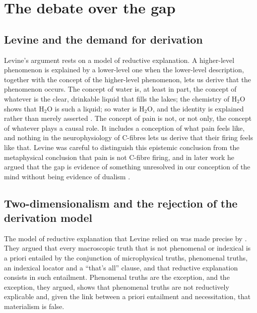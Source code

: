\documentclass{situationist-preprint}
\begin{document}
\section{The debate over the gap}\label{s:history}

\subsection{Levine and the demand for derivation}

Levine's argument rests on a model of reductive explanation. A higher-level phenomenon is explained by a lower-level one when the lower-level description, together with the concept of the higher-level phenomenon, lets us derive that the phenomenon occurs. The concept of water is, at least in part, the concept of whatever is the clear, drinkable liquid that fills the lakes; the chemistry of H$_2$O shows that H$_2$O is such a liquid; so water is H$_2$O, and the identity is explained rather than merely asserted \citep{Levine1993}. The concept of pain is not, or not only, the concept of whatever plays a causal role. It includes a conception of what pain feels like, and nothing in the neurophysiology of C-fibres lets us derive that their firing feels like that. Levine was careful to distinguish this epistemic conclusion from the metaphysical conclusion that pain is not C-fibre firing, and in later work he argued that the gap is evidence of something unresolved in our conception of the mind without being evidence of dualism \citep{Levine2001}.

\subsection{Two-dimensionalism and the rejection of the derivation model}

The model of reductive explanation that Levine relied on was made precise by \citet{ChalmersJackson2001}. They argued that every macroscopic truth that is not phenomenal or indexical is a priori entailed by the conjunction of microphysical truths, phenomenal truths, an indexical locator and a \enquote{that's all} clause, and that reductive explanation consists in such entailment. Phenomenal truths are the exception, and the exception, they argued, shows that phenomenal truths are not reductively explicable and, given the link between a priori entailment and necessitation, that materialism is false.
\end{document}
